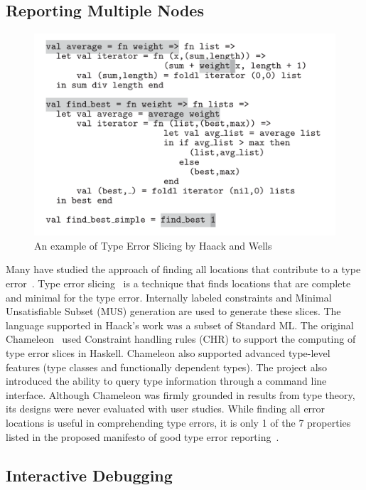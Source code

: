 \subsection{Reporting Multiple Nodes}

\begin{figure}
    \includegraphics[]{HaackTypeErrorSlicing}
    \caption{An example of Type Error Slicing by Haack and Wells
    }
\end{figure}

Many have studied the approach of finding all locations that contribute to a type error~\cite{Stuckey2003-pz, Haack2004-fr, Pavlinovic2015-ke, Schilling2012-iq}. Type error slicing~\cite{Haack2004-fr} is a technique that finds locations that are complete and minimal for the type error. Internally labeled constraints and Minimal Unsatisfiable Subset (MUS) generation are used to generate these slices. The language supported in Haack's work was a subset of Standard ML. The original Chameleon~\cite{Stuckey2003-pz} used  Constraint handling rules (CHR) to support the computing of type error slices in Haskell. Chameleon also supported advanced type-level features (type classes and functionally dependent types). The project also introduced the ability to query type information through a command line interface. Although Chameleon was firmly grounded in results from type theory, its designs were never evaluated with user studies. While finding all error locations is useful in comprehending type errors, it is only 1 of the 7 properties listed in the proposed manifesto of good type error reporting~\cite{Yang2000-wn}.

\subsection{Interactive Debugging}

